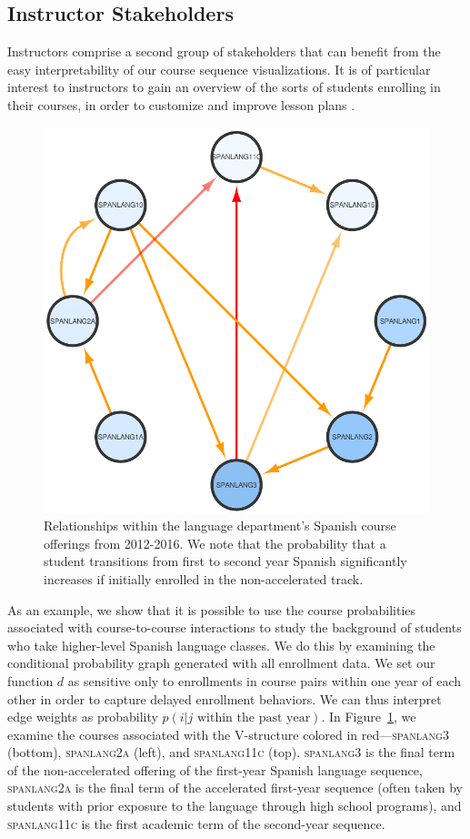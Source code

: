 \subsection{Instructor Stakeholders}
\label{sec:instructor_stakeholders}

Instructors comprise a second group of stakeholders that can benefit from
the easy interpretability of our course sequence visualizations. It is
of particular interest to instructors to gain an overview of the sorts
of students enrolling in their courses, in order to customize
and improve lesson plans \cite{Leaver2002}.

\begin{figure}[h]
    \centering
    \includegraphics[width=0.4\columnwidth]{Figs/final-spanlang.pdf}  
    \caption{Relationships within the language department's Spanish course offerings from 2012-2016. We note that the probability that a student transitions from first to second year Spanish significantly increases if initially enrolled in the non-accelerated track.}
    \label{fig:spanlang}
\end{figure}

As an example, we show that it is possible to use the course probabilities associated with course-to-course interactions to study the background of students who take higher-level Spanish language classes. We do this by examining the conditional probability graph generated with
all enrollment data. We set our function $d$ as sensitive only to
enrollments in course pairs within one year of each other in order to
capture delayed enrollment behaviors. We can thus interpret edge
weights as probability $p(i|j \text{ within the past year})$. In
Figure~\ref{fig:spanlang}, we examine the courses associated with the
V-structure colored in red---\textsc{spanlang3} (bottom),
\textsc{spanlang2a} (left), and \textsc{spanlang11c}
(top). \textsc{spanlang3} is the final term of the non-accelerated
offering of the first-year Spanish language sequence,
\textsc{spanlang2a} is the final term of the accelerated first-year
sequence (often taken by students with prior exposure to the language
through high school programs), and \textsc{spanlang11c} is the first
academic term of the second-year sequence.

